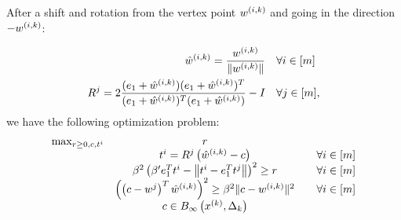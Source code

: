After a shift and rotation from the vertex point ${w^{(i, k)}}$ and going in the direction $-{w^{(i, k)}}$:

\begin{align*}
\hat w^{(i,k)} = \frac {{w^{(i, k)}}} {\|{w^{(i, k)}}\|} & \quad \forall i \in [m] \\
R^j = 2 \frac{(e_1 + \hat w^{(i,k)})(e_1 + \hat w^{(i,k)})^T}{(e_1 + \hat w^{(i,k)})^T(e_1 + \hat w^{(i,k)})} - I  & \quad \forall j \in [m],
\end{align*}
we have the following optimization problem:
\begin{align*}
\begin{array} {ccc}
\max_{r \ge 0, c, t^i}	& r & \\
					& t^i = R^j\left(\hat w^{(i,k)} - c\right) 									& \quad \forall i \in [m] \\
					& \beta^2 \left(\beta' e_1^T t^i - \left\|t^i - e_1^T t^j\right\|\right)^2 \ge r			& \quad \forall i \in [m] \\
					& \left(\left(c - w^j\right)^T\hat w^{(i,k)}\right)^2 \ge \beta^2 \|c - {w^{(i, k)}}\|^2		& \quad \forall i \in [m] \\
					& c \in { B_{\infty}\left(x^{(k)}, \Delta_k\right) } &
\end{array}
\end{align*}

% 
% 
% 
% 
% 
% 
% 

